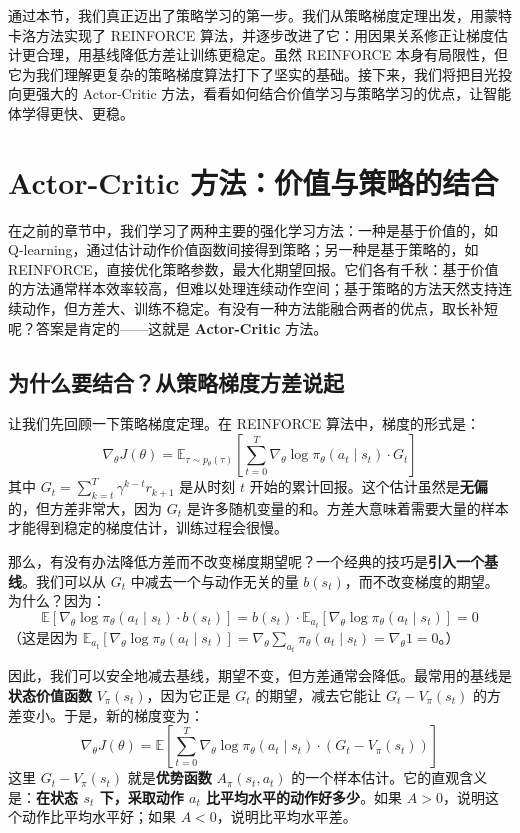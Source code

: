 \documentclass[lang=cn,zihao=-4,a4paper,fontset=windows]{beautybook}
\begin{document}
通过本节，我们真正迈出了策略学习的第一步。我们从策略梯度定理出发，用蒙特卡洛方法实现了 REINFORCE 算法，并逐步改进了它：用因果关系修正让梯度估计更合理，用基线降低方差让训练更稳定。虽然 REINFORCE 本身有局限性，但它为我们理解更复杂的策略梯度算法打下了坚实的基础。接下来，我们将把目光投向更强大的 Actor-Critic 方法，看看如何结合价值学习与策略学习的优点，让智能体学得更快、更稳。

\section{Actor-Critic 方法：价值与策略的结合}

在之前的章节中，我们学习了两种主要的强化学习方法：一种是基于价值的，如 Q-learning，通过估计动作价值函数间接得到策略；另一种是基于策略的，如 REINFORCE，直接优化策略参数，最大化期望回报。它们各有千秋：基于价值的方法通常样本效率较高，但难以处理连续动作空间；基于策略的方法天然支持连续动作，但方差大、训练不稳定。有没有一种方法能融合两者的优点，取长补短呢？答案是肯定的——这就是 \textbf{Actor-Critic} 方法。

\subsection{为什么要结合？从策略梯度方差说起}

让我们先回顾一下策略梯度定理。在 REINFORCE 算法中，梯度的形式是：
\[
\nabla_\theta J(\theta) = \mathbb{E}_{\tau \sim p_\theta(\tau)}\left[ \sum_{t=0}^T \nabla_\theta \log \pi_\theta(a_t \mid s_t) \cdot G_t \right]
\]
其中 \(G_t = \sum_{k=t}^T \gamma^{k-t} r_{k+1}\) 是从时刻 \(t\) 开始的累计回报。这个估计虽然是\textbf{无偏}的，但方差非常大，因为 \(G_t\) 是许多随机变量的和。方差大意味着需要大量的样本才能得到稳定的梯度估计，训练过程会很慢。

那么，有没有办法降低方差而不改变梯度期望呢？一个经典的技巧是\textbf{引入一个基线}。我们可以从 \(G_t\) 中减去一个与动作无关的量 \(b(s_t)\)，而不改变梯度的期望。为什么？因为：
\[
\mathbb{E}\left[ \nabla_\theta \log \pi_\theta(a_t \mid s_t) \cdot b(s_t) \right] = b(s_t) \cdot \mathbb{E}_{a_t}[\nabla_\theta \log \pi_\theta(a_t \mid s_t)] = 0
\]
（这是因为 \(\mathbb{E}_{a_t}[\nabla_\theta \log \pi_\theta(a_t \mid s_t)] = \nabla_\theta \sum_{a_t} \pi_\theta(a_t \mid s_t) = \nabla_\theta 1 = 0\)。）

因此，我们可以安全地减去基线，期望不变，但方差通常会降低。最常用的基线是\textbf{状态价值函数} \(V_\pi(s_t)\)，因为它正是 \(G_t\) 的期望，减去它能让 \(G_t - V_\pi(s_t)\) 的方差变小。于是，新的梯度变为：
\[
\nabla_\theta J(\theta) = \mathbb{E}\left[ \sum_{t=0}^T \nabla_\theta \log \pi_\theta(a_t \mid s_t) \cdot (G_t - V_\pi(s_t)) \right]
\]
这里 \(G_t - V_\pi(s_t)\) 就是\textbf{优势函数} \(A_\pi(s_t, a_t)\) 的一个样本估计。它的直观含义是：\textbf{在状态 \(s_t\) 下，采取动作 \(a_t\) 比平均水平的动作好多少}。如果 \(A>0\)，说明这个动作比平均水平好；如果 \(A<0\)，说明比平均水平差。
\end{document}
